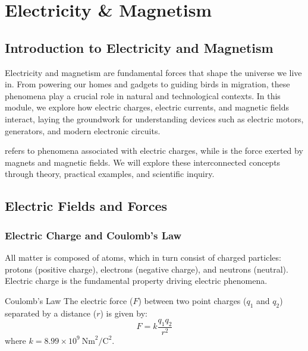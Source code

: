 \chapter{Electricity \& Magnetism}

\section{Introduction to Electricity and Magnetism}
\FloatBarrier

Electricity and magnetism are fundamental forces that shape the universe we live in. From powering our homes and gadgets to guiding birds in migration, these phenomena play a crucial role in natural and technological contexts. In this module, we explore how electric charges, electric currents, and magnetic fields interact, laying the groundwork for understanding devices such as electric motors, generators, and modern electronic circuits.


 refers to phenomena associated with electric charges, while  is the force exerted by magnets and magnetic fields. We will explore these interconnected concepts through theory, practical examples, and scientific inquiry.

\section{Electric Fields and Forces}
\FloatBarrier

\subsection{Electric Charge and Coulomb's Law}
\FloatBarrier

All matter is composed of atoms, which in turn consist of charged particles: protons (positive charge), electrons (negative charge), and neutrons (neutral). Electric charge is the fundamental property driving electric phenomena.

\begin{keyconcept}{Coulomb's Law}
The electric force ($F$) between two point charges ($q_1$ and $q_2$) separated by a distance ($r$) is given by:
\[
F = k\frac{q_1 q_2}{r^2}
\]
where $k = 8.99 \times 10^9~\text{Nm}^2/\text{C}^2$.
\end{keyconcept}


